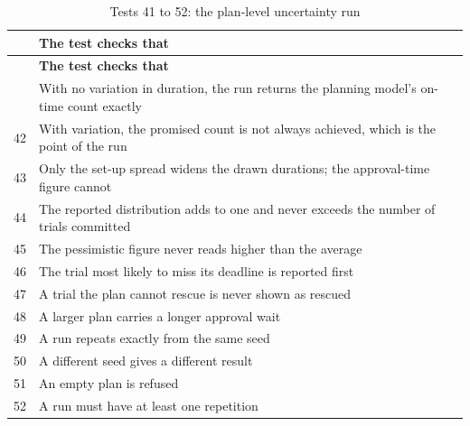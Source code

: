 \begin{longtable}{@{}rp{}@{}}
  \caption{Tests 41 to 52: the plan-level uncertainty run}
  \label{tab:tests6}\\
  \toprule
  & \textbf{The test checks that} \\
  \midrule
  \endfirsthead
  \toprule
  & \textbf{The test checks that} \\
  \midrule
  \endhead
  \bottomrule
  \endfoot
  41 & With no variation in duration, the run returns the planning model's on-time count exactly \\
  42 & With variation, the promised count is not always achieved, which is the point of the run \\
  43 & Only the set-up spread widens the drawn durations; the approval-time figure cannot \\
  44 & The reported distribution adds to one and never exceeds the number of trials committed \\
  45 & The pessimistic figure never reads higher than the average \\
  46 & The trial most likely to miss its deadline is reported first \\
  47 & A trial the plan cannot rescue is never shown as rescued \\
  48 & A larger plan carries a longer approval wait \\
  49 & A run repeats exactly from the same seed \\
  50 & A different seed gives a different result \\
  51 & An empty plan is refused \\
  52 & A run must have at least one repetition \\
\end{longtable}
